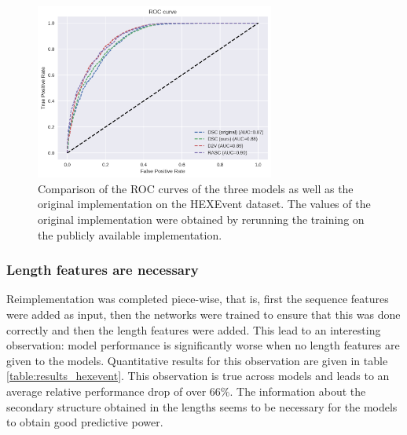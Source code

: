 \begin{figure}
	\centering\includegraphics[width=0.7\textwidth]{../visualizations/ch5-results/hexevent_cross_model_roc_auc_comparison.png} 
	\caption{Comparison of the ROC curves of the three models as well as the original implementation on the HEXEvent dataset. The values of the original implementation were obtained by rerunning the training on the publicly available implementation. }
	\label{fig:hexevent_auc}
\end{figure}






\subsubsection{Length features are necessary}
Reimplementation was completed piece-wise, that is, first the sequence features were added as input, then the networks were trained to ensure that this was done correctly and then the length features were added. This lead to an interesting observation: model performance is significantly worse when no length features are given to the models. Quantitative results for this observation are given in table \ref{table:results_hexevent}. This observation is true across models and leads to an average relative performance drop of over 66\%. The information about the secondary structure obtained in the lengths seems to be necessary for the models to obtain good predictive power.


